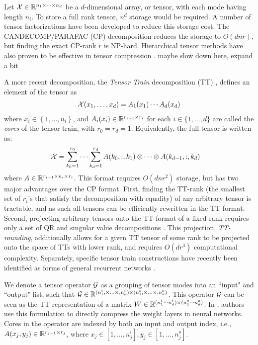 Let $\mathcal{X} \in \mathbb{R}^{n_1 \times \cdots \times n_d}$ be a $d$-dimensional array, or tensor, with each mode having length $n_i$. To store a full rank tensor, $n^d$ storage would be required. A number of tensor factorizations have been developed to reduce this storage cost. The CANDECOMP/PARAFAC (CP) \cite{harshman1970foundations,carroll1970analysis} decomposition reduces the storage to $O(dnr)$, but finding the exact CP-rank $r$ is NP-hard. Hierarchical tensor methods have also proven to be effective in tensor compression \cite{cohen2016expressive, cohen2016convolutional}. {\color{red} maybe slow down here, expand a bit}

A more recent decomposition, the \textit{Tensor Train} decomposition (TT) \cite{oseledets2011tensor}, defines an element of the tensor as
\begin{align}
\mathcal{X}(x_1,\ldots,x_d) = A_1(x_1)\cdots A_d(x_d)
\end{align}
where $x_i \in \left\{1,\ldots, n_i\right\}$, and $A_i(x_i) \in \mathbb{R}^{r_{i-1} \times r_{i}}$ for each $i \in \{1,\ldots,d\}$ are called the \textit{cores} of the tensor train, with $r_0 = r_d = 1$. Equivalently, the full tensor is written as:
\begin{align}\label{eq:fullTT}
    \mathcal{X} &= \sum_{k_0 = 1}^{r_0} \cdots \sum_{k_d = 1}^{r_d} A(k_0,:,k_1) \otimes \cdots \otimes A(k_{d-1},:,k_d) 
\end{align}
where $A \in \mathbb{R}^{r_{i-1}\times n_i \times r_i} $. This format requires $O(dnr^2)$ storage, but has two major advantages over the CP format. First, finding the TT-rank (the smallest set of $r_i$'s that satisfy the decomposition with equality) of any arbitrary tensor is tractable, and as such all tensors can be efficiently rewritten in the TT format. Second, projecting arbitrary tensors onto the TT format of a fixed rank requires only a set of QR and singular value decompositions \cite{oseledets2011tensor}. This projection, \textit{TT-rounding}, additionally allows for a given TT tensor of some rank to be projected onto the space of TTs with lower rank, and requires $O(dr^3)$ computational complexity. Separately, specific tensor train constructions have recently been identified as forms of general recurrent networks \cite{khrulkov2018generalized}.

We denote a tensor operator $\mathcal{G}$ as a grouping of tensor modes into an ``input" and ``output" list, such that $\mathcal{G} \in \mathbb{R}^{(n_1^i,\times\ldots\times,n_d^i) \times (n_1^o,\times\ldots\times,n_d^o)}$. This operator $\mathcal{G}$ can be seen as the TT representation of a matrix $W \in \mathbb{R}^{(n_1^i\cdots n_d^i) \times (n_1^o\cdots n_d^o)}$. In \cite{novikov2015tensorizing}, authors use this formulation to directly compress the weight layers in neural networks. Cores in the operator are indexed by both an input and output index, i.e., $A(x_j,y_j) \in \mathbb{R}^{r_{j-1}\times r_j}$, where $x_j \in [1,\ldots,n_j^i], y_j \in [1,\ldots,n_j^o]$.

